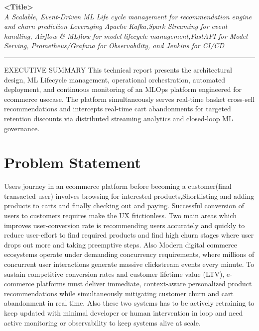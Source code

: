 \documentclass[11pt,a4paper]{article}
\begin{document}
\begin{center}
    {\Huge \textbf{\color{DeepNavy} <Title>}} \\[0.8em]
    {\large \textit{\color{SlateBlue} A Scalable, Event-Driven ML Life cycle management for recommendation engine and churn prediction Leveraging Apache Kafka,Spark Streaming for event handling, Airflow & MLflow for model lifecycle management,FastAPI for Model Serving, Prometheus/Grafana for Observability, and Jenkins for CI/CD}} \\[1.2em]
    \rule{\textwidth}{1pt}
\end{center}

\vspace{-0.5em}


\begin{calloutbox}{EXECUTIVE SUMMARY}
This technical report presents the architectural design, ML Lifecycle management, operational orchestration, automated deployment, and continuous monitoring of an MLOps platform engineered for ecommerce usecase. The platform simultaneously serves real-time basket cross-sell recommendations  and intercepts real-time cart abandonments for targeted retention discounts via distributed streaming analytics and closed-loop ML governance.
\end{calloutbox}

\section{Problem Statement}

Users journey in an ecommerce platform before becoming a customer(final transacted user) involves browsing for interested products,Shortlisting and adding products to carts and finally checking out and paying. Successful conversion of users to customers requires make the UX frictionless. Two main areas which improves user-conversion rate is recommending users accurately and quickly to reduce user-effort to find required products and find high churn stages where user drops out more and taking preemptive steps. Also Modern digital commerce ecosystems operate under demanding concurrency requirements, where millions of concurrent user interactions generate massive clickstream events every minute. To sustain competitive conversion rates and customer lifetime value (LTV), e-commerce platforms must deliver immediate, context-aware personalized product recommendations while simultaneously mitigating customer churn and cart abandonment in real time. Also these two systems has to be actively retraining to keep updated with minimal developer or human intervention in loop and need active monitoring or observability to keep systems alive at scale.
\end{document}
